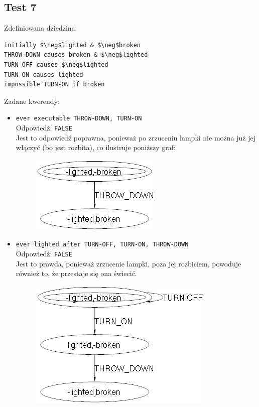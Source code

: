 \documentclass{article}
\begin{document}
\newpage
\subsection{Test 7}

Zdefiniowana dziedzina:
\bigskip
{}
\begin{lstlisting}[mathescape=true]
initially $\neg$lighted & $\neg$broken
THROW-DOWN causes broken & $\neg$lighted
TURN-OFF causes $\neg$lighted
TURN-ON causes lighted
impossible TURN-ON if broken
\end{lstlisting}

\vspace{1cm}

Zadane kwerendy:
\begin{itemize}
    \item {\large\texttt{ever executable THROW-DOWN, TURN-ON}}\\
    Odpowiedź: \texttt{FALSE}\\
    Jest to odpowiedź poprawna, ponieważ po zrzuceniu lampki nie można już jej włączyć (bo jest rozbita), co ilustruje poniższy graf:
    \begin{figure}[H]
    \centering
    \includegraphics[scale=0.5]{7_1}
    \end{figure}
	
    \item {\large\texttt{ever lighted after TURN-OFF, TURN-ON, THROW-DOWN}}\\
    Odpowiedź: \texttt{FALSE}\\
    Jest to prawda, ponieważ zrzucenie lampki, poza jej rozbiciem, powoduje również to, że przestaje się ona świecić.
    \begin{figure}[H]
    \centering
    \includegraphics[scale=0.5]{7_2}
    \end{figure}


\end{itemize}
\end{document}
